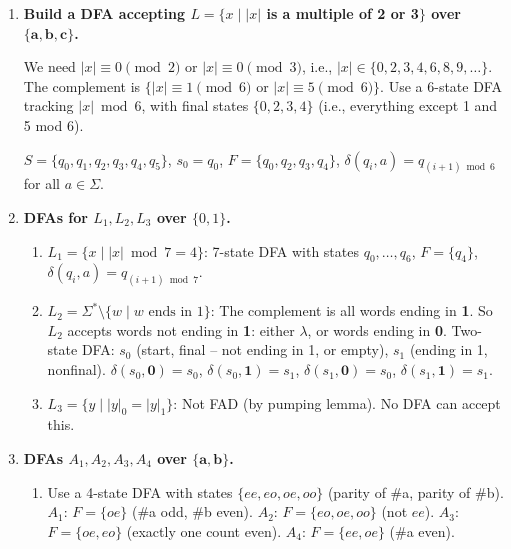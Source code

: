 \documentclass[11pt]{book}
\begin{document}
\begin{enumerate}[{1.}1.]
\begin{enumerate}
\item The language: the machine of Figure 1.26 is a 2-state DFA over $\{\mathbf{a},\mathbf{b}\}$ that accepts all words in which the number of $\mathbf{b}$s is odd.
\end{enumerate}

\item \textbf{Build a DFA accepting $L = \{x \mid |x|$ is a multiple of 2 or 3$\}$ over $\{\mathbf{a},\mathbf{b},\mathbf{c}\}$.}

We need $|x| \equiv 0\pmod{2}$ or $|x|\equiv 0\pmod{3}$, i.e., $|x| \in \{0,2,3,4,6,8,9,\ldots\}$. The complement is $\{|x|\equiv 1\pmod{6}$ or $|x|\equiv 5\pmod{6}\}$. Use a 6-state DFA tracking $|x|\bmod 6$, with final states $\{0,2,3,4\}$ (i.e., everything except 1 and 5 mod 6).

$S = \{q_0,q_1,q_2,q_3,q_4,q_5\}$, $s_0 = q_0$, $F = \{q_0,q_2,q_3,q_4\}$, $\delta(q_i, a) = q_{(i+1)\bmod 6}$ for all $a\in\Sigma$.

\item \textbf{DFAs for $L_1, L_2, L_3$ over $\{0,1\}$.}

\begin{enumerate}
\item $L_1 = \{x \mid |x|\bmod 7 = 4\}$: 7-state DFA with states $q_0,\ldots,q_6$, $F=\{q_4\}$, $\delta(q_i,a)=q_{(i+1)\bmod 7}$.

\item $L_2 = \Sigma^* \setminus \{w \mid w \text{ ends in }1\}$: The complement is all words ending in \textbf{1}. So $L_2$ accepts words not ending in \textbf{1}: either $\lambda$, or words ending in \textbf{0}. Two-state DFA: $s_0$ (start, final -- not ending in 1, or empty), $s_1$ (ending in 1, nonfinal). $\delta(s_0,\mathbf{0})=s_0$, $\delta(s_0,\mathbf{1})=s_1$, $\delta(s_1,\mathbf{0})=s_0$, $\delta(s_1,\mathbf{1})=s_1$.

\item $L_3 = \{y \mid |y|_0 = |y|_1\}$: Not FAD (by pumping lemma). No DFA can accept this.
\end{enumerate}

\item \textbf{DFAs $A_1, A_2, A_3, A_4$ over $\{\mathbf{a},\mathbf{b}\}$.}

\begin{enumerate}
\item Use a 4-state DFA with states $\{ee, eo, oe, oo\}$ (parity of \#a, parity of \#b). $A_1$: $F=\{oe\}$ (\#a odd, \#b even). $A_2$: $F=\{eo,oe,oo\}$ (not $ee$). $A_3$: $F=\{oe,eo\}$ (exactly one count even). $A_4$: $F=\{ee,oe\}$ (\#a even).


\end{enumerate}
\end{enumerate}
\end{document}
